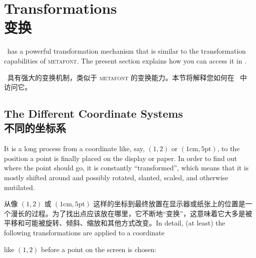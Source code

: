\setcounter{section}{24}
\setcounter{subsection}{4}
\setcounter{subsubsection}{2}

%
%
%


\section{Transformations\\变换}

\pgfname\ has a powerful transformation mechanism that is similar to the
transformation capabilities of \textsc{metafont}. The present section explains
how you can access it in \tikzname.

\pgfname\ 具有强大的变换机制，类似于 \textsc{metafont} 的变换能力。本节将解释您如何在 \tikzname\ 中访问它。


\subsection{The Different Coordinate Systems\\不同的坐标系}

It is a long process from  a coordinate like, say, $(1,2)$ or
$(1\mathrm{cm},5\mathrm{pt})$, to the position a point is finally placed on the
display or paper. In order to find out where the point should go, it is
constantly ``transformed'', which means that it is mostly shifted around and
possibly rotated, slanted, scaled, and otherwise mutilated.

从像 $(1,2)$ 或 $(1\mathrm{cm},5\mathrm{pt})$ 这样的坐标到最终放置在显示器或纸张上的位置是一个漫长的过程。为了找出点应该放在哪里，它不断地“变换”，这意味着它大多是被平移和可能被旋转、倾斜、缩放和其他方式改变。In detail, (at least) the following transformations are applied to a coordinate

like $(1,2)$ before a point on the screen is chosen:

